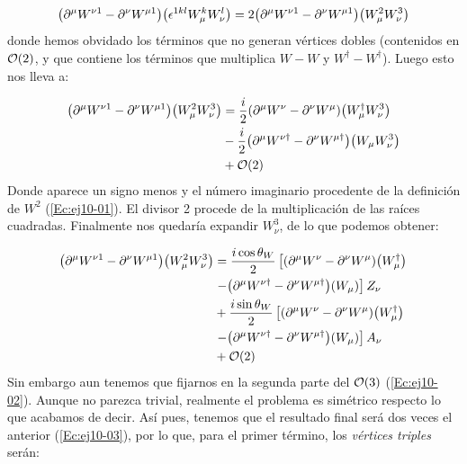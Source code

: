 \begin{itemize}
	\begin{equation}
		\pqty{\partial^\mu W^{\nu 1} - \partial^\nu W^{\mu 1}}\pqty{\epsilon^{1kl} W^k_\mu W^l_\nu} = 2
		\pqty{\partial^\mu W^{\nu 1} - \partial^\nu W^{\mu 1 }}\pqty{ W^2_\mu W^3_\nu}
	\end{equation}
	donde hemos obvidado los términos que no generan vértices dobles (contenidos en $\mathcal{O}(2)$, y que contiene los términos que multiplica $W-W$ y $W^\dagger-W^\dagger$). Luego esto nos lleva a:

	\begin{align}
		\pqty{\partial^\mu W^{\nu 1} - \partial^\nu W^{\mu 1}}\pqty{ W^2_\mu W^3_\nu} & =  \frac{i}{2}\pqty{\partial^\mu W^{\nu } - \partial^\nu W^{\mu }}\pqty{ W^\dagger_\mu W^3_\nu} \nonumber \\
		& - \frac{i}{2}\pqty{\partial^\mu W^{\nu \dagger } - \partial^\nu W^{\mu \dagger}}\pqty{ W_\mu W^3_\nu} \nonumber \\
		& + \Ocal(2)
	\end{align}
	Donde aparece un signo menos y el número imaginario procedente de la definición de $W^2$ (\ref{Ec:ej10-01}). El divisor 2 procede de la multiplicación de las raíces cuadradas. Finalmente nos quedaría expandir $W_{\nu}^3$, de lo que podemos obtener: 


	\begin{align}
		\pqty{\partial^\mu W^{\nu 1} - \partial^\nu W^{\mu 1}}\pqty{ W^2_\mu W^3_\nu} & =  \frac{i\cos \theta_W}{2}\left[ \pqty{\partial^\mu W^{\nu } - \partial^\nu W^{\mu }}\pqty{ W^\dagger_\mu } \nonumber  \right. \\
		& \left. - \pqty{\partial^\mu W^{\nu \dagger } - \partial^\nu W^{\mu \dagger}}\pqty{ W_\mu } \right] Z_\nu \nonumber \\ & + 
		 \frac{i\sin \theta_W}{2}\left[ \pqty{\partial^\mu W^{\nu } - \partial^\nu W^{\mu }}\pqty{ W^\dagger_\mu } \nonumber  \right. \\
		& \left. - \pqty{\partial^\mu W^{\nu \dagger } - \partial^\nu W^{\mu \dagger}}\pqty{ W_\mu} \right] A_\nu \nonumber \\
		& + \Ocal(2) \label{Ec:ej10-03}
	\end{align}
	Sin embargo aun tenemos que fijarnos en la segunda parte del $\mathcal{O}(3)$ (\ref{Ec:ej10-02}). Aunque no parezca trivial, realmente el problema es simétrico respecto lo que acabamos de decir. Así pues, tenemos que el resultado final será dos veces el anterior (\ref{Ec:ej10-03}), por lo que, para el primer término, los \textit{vértices triples} serán: 



\end{itemize}
